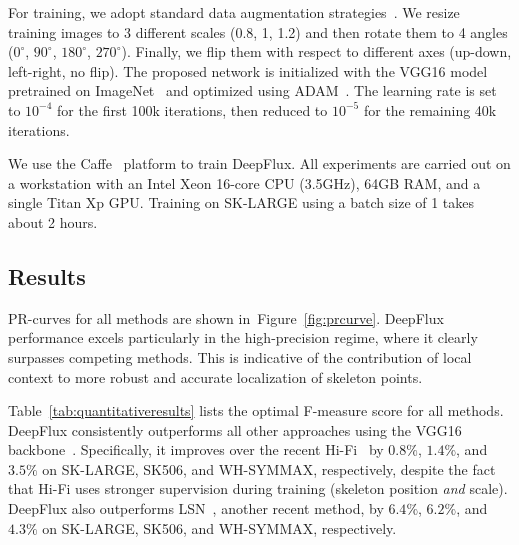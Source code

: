 \documentclass[10pt,twocolumn,letterpaper]{article}
\newcommand{\reffig}[1]{Figure~\ref{#1}}
\newcommand{\reftab}[1]{Table~\ref{#1}}
\begin{document}
For training, we adopt standard data augmentation strategies~\cite{shen2016fsds,shen2017lmsds,zhao2018hifi}.
We resize training images to 3 different scales (0.8, 1, 1.2) and then rotate them to 4 angles ($0^\circ$, $90^\circ$, $180^\circ$, $270^\circ$).
Finally, we flip them with respect to different axes (up-down, left-right, no flip).
The proposed network is initialized with the VGG16 model pretrained on ImageNet~\cite{imagenet} and optimized using ADAM~\cite{kinga2015adam}.
The learning rate is set to $10^{-4}$ for the first 100k iterations, then reduced to $10^{-5}$ for the remaining 40k iterations.

We use the Caffe~\cite{jia2014caffe} platform to train DeepFlux. All experiments are carried out on a workstation with an Intel Xeon 16-core CPU (3.5GHz), 64GB RAM, and a single Titan Xp GPU.
Training on SK-LARGE using a batch size of 1 takes about 2 hours.



\subsection{Results} \label{sec:results}
PR-curves for all methods are shown in~\reffig{fig:prcurve}.
DeepFlux performance excels particularly in the high-precision regime, where it clearly surpasses competing methods.
This is indicative of the contribution of local context to more robust and accurate localization of skeleton points.

\reftab{tab:quantitativeresults} lists the optimal F-measure score for all methods.
DeepFlux consistently outperforms all other approaches using the VGG16 backbone~\cite{vgg16network}.
Specifically, it improves over the recent Hi-Fi~\cite{zhao2018hifi} by $0.8\%$, $1.4\%$, and $3.5\%$ on SK-LARGE, SK506, and WH-SYMMAX, respectively, despite the fact that Hi-Fi uses stronger supervision during training (skeleton position \emph{and} scale).
DeepFlux also outperforms LSN~\cite{liu2018lsn}, another recent method, by $6.4\%$, $6.2\%$, and $4.3\%$ on SK-LARGE, SK506, and WH-SYMMAX, respectively.
\end{document}
